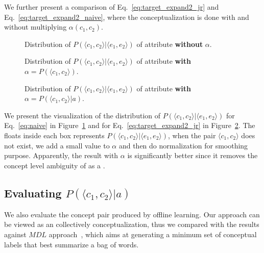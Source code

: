 We further present a comparison of Eq.~\ref{eq:target_expand2_jr} and Eq.~\ref{eq:target_expand2_naive}, where the conceptualization is done with and without multiplying $\alpha(c_1,c_2)$.

\begin{figure}[!htb]
\centering
{}
\caption{Distribution of $P(\langle c_1,c_2 \rangle|\langle e_1,e_2 \rangle )$ of attribute  \textbf{without} $\alpha$. }
\label{fig:c1c2}
\end{figure}

\begin{figure}[!htb]
\centering
{}
\caption{Distribution of $P(\langle c_1,c_2 \rangle|\langle e_1,e_2 \rangle )$ of attribute  \textbf{with} $\alpha=P(\langle c_1,c_2 \rangle)$. }
\label{fig:c1c2_alpha}
\end{figure}

\begin{figure}[!htb]
\centering
{}
\caption{Distribution of $P(\langle c_1,c_2 \rangle|\langle e_1,e_2 \rangle )$ of attribute  \textbf{with} $\alpha=P(\langle c_1,c_2 \rangle|a)$. }
\label{fig:c1c2_alpha_given_a}
\end{figure}


We present the visualization of the distribution of $P(\langle c_1,c_2 \rangle|\langle e_1,e_2 \rangle )$ for Eq.~\ref{eq:naive} in Figure~\ref{fig:c1c2} and for Eq.~\ref{eq:target_expand2_jr} in Figure~\ref{fig:c1c2_alpha}.
The floats inside each box represents $P(\langle c_1,c_2 \rangle|\langle e_1,e_2 \rangle )$, when the pair $\langle c_1,c_2 \rangle$ does not exist, we add a small value to $\alpha$ and then do normalization for smoothing purpose.
Apparently, the result with $\alpha$ is significantly better since it removes the concept level ambiguity of  as a .

\subsection{Evaluating $P(\langle c_1,c_2 \rangle |a )$}

We also evaluate the concept pair produced by offline learning.
Our approach can be viewed as an collectively conceptualization, thus we compared with the results against $MDL$ approach~\cite{sunconceptual}, which aims at generating a minimum set of conceptual labels that best summarize a bag of words.

